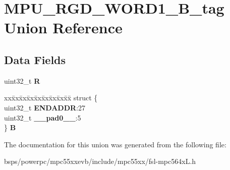 \hypertarget{unionMPU__RGD__WORD1__32B__tag}{}\section{M\+P\+U\+\_\+\+R\+G\+D\+\_\+\+W\+O\+R\+D1\+\_\+B\+\_\+tag Union Reference}
\label{unionMPU__RGD__WORD1__32B__tag}
\subsection*{Data Fields}
\begin{DoxyCompactItemize}
\item 
\mbox{\label{unionMPU__RGD__WORD1__32B__tag_aadf4236c97c1b7fbb36a2a9798686dde}} 
uint32\+\_\+t {\bfseries R}
\item 
\mbox{\label{unionMPU__RGD__WORD1__32B__tag_a3d33b29075d41de3b405a087292d6958}} 
\begin{tabbing}
xx\=xx\=xx\=xx\=xx\=xx\=xx\=xx\=xx\=\kill
struct \{\\
\>uint32\_t {\bfseries ENDADDR}:27\\
\>uint32\_t {\bfseries \_\_pad0\_\_}:5\\
\} {\bfseries B}\\

\end{tabbing}\end{DoxyCompactItemize}


The documentation for this union was generated from the following file\+:\begin{DoxyCompactItemize}
\item 
bsps/powerpc/mpc55xxevb/include/mpc55xx/fsl-\/mpc564x\+L.\+h\end{DoxyCompactItemize}
